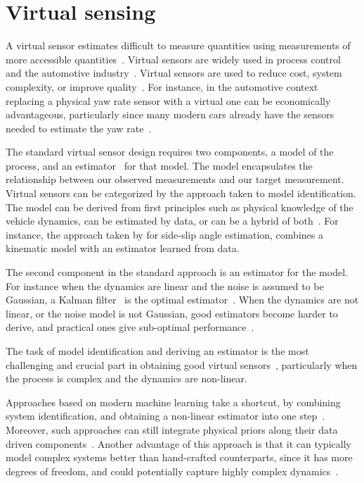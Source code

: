 \documentclass[../main.tex]{subfiles}
\begin{document}
\section{Virtual sensing}

A virtual sensor estimates difficult to measure quantities using measurements of more accessible quantities~\citep{li2011review}. Virtual sensors are widely used in process control~\citep{fortuna2007soft, kadlec2009data} and the automotive industry~\citep{gustafsson2001virtual, shraim2006sliding, doumiati2009virtual}. Virtual sensors are used to reduce cost, system complexity, or improve quality~\citep{rockl2008integration}. For instance, in the automotive context replacing a physical yaw rate sensor with a virtual one can be economically advantageous, particularly since many modern cars already have the sensors needed to estimate the yaw rate~\citep{canale2008study}.

The standard virtual sensor design requires two components, a model of the process, and an estimator~\citep{canale2008study} for that model. The model encapsulates the relationship between our observed measurements and  our target measurement. Virtual sensors can be categorized by the approach taken to model identification. The model can be derived from first principles such as physical knowledge of the vehicle dynamics, can be estimated by data, or can be a hybrid of both~\citep{li2011review}. For instance, the approach taken by \cite{graber2018hybrid} for side-slip angle estimation, combines a kinematic model with an estimator learned from data. 

The second component in the standard approach is an estimator for the model. For instance when the dynamics are linear and the noise is assumed to be Gaussian, a Kalman filter~\citep{zarchan2013fundamentals} is the optimal estimator~\citep{canale2008study}. When the dynamics are not linear, or the noise model is not Gaussian, good estimators become harder to derive, and practical ones give sub-optimal performance~\citep{milanese2006filter}. 

The task of model identification and deriving an estimator is the most challenging and crucial part in obtaining good virtual sensors~\citep{li2011review}, particularly when the process is complex and the dynamics are non-linear.  

Approaches based on modern machine learning take a shortcut, by combining system identification, and obtaining a non-linear estimator into one step~\citep{rastogi2017virtual}. Moreover, such approaches can still integrate physical priors along their data driven components~\citep{costa1999hybrid, graber2018hybrid}. Another advantage of this approach is that it can typically model complex systems better than hand-crafted counterparts, since it has more degrees of freedom, and could potentially capture highly complex dynamics~\citep{li2011review}. 
\end{document}
